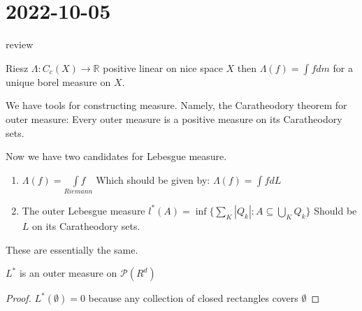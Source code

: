 \section{ 2022-10-05 }

review

\begin{theorem}
	Riesz $ \Lambda : C_c (X) \to \mathbb{R}$ positive linear on nice space $X$ then $\Lambda(f) = \int f dm$ for a unique borel measure on $X$.
\end{theorem}

We have tools for constructing measure. Namely, the Caratheodory theorem for outer measure: Every outer measure is a positive measure on its Caratheodory sets.

Now we have two candidates for Lebesgue measure.

\begin{enumerate}
	\item $\Lambda (f) = \underset{Riemann}{\int f}$
		Which should be given by: $\Lambda(f) = \int f dL$
	\item The outer Lebesgue measure  $l^* (A) = \inf\{\sum_K |Q_k| : A \subseteq \bigcup_{K} Q_k \}$ Should be $L$ on its Caratheodory sets.
\end{enumerate}

These are essentially the same.

\begin{lemma}
	$L^*$ is an outer measure on $\mathcal{P}(R^d)$
\end{lemma}

\begin{proof}
	$L^* (\emptyset)= 0$ because any collection of closed rectangles covers  $\emptyset$
\end{proof}


